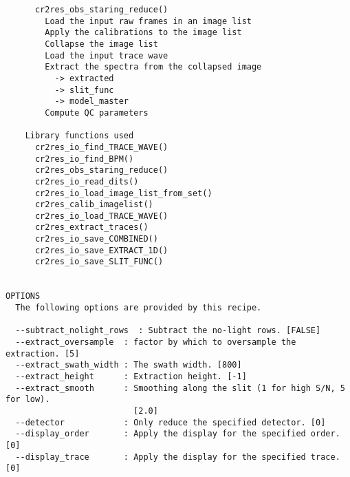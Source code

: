 \begin{verbatim}
      cr2res_obs_staring_reduce()                                         
        Load the input raw frames in an image list                        
        Apply the calibrations to the image list                          
        Collapse the image list                                           
        Load the input trace wave                                         
        Extract the spectra from the collapsed image                      
          -> extracted                                                    
          -> slit_func                                                    
          -> model_master                                                 
        Compute QC parameters                                             
                                                                          
    Library functions used                                                
      cr2res_io_find_TRACE_WAVE()                                         
      cr2res_io_find_BPM()                                                
      cr2res_obs_staring_reduce()                                         
      cr2res_io_read_dits()                                               
      cr2res_io_load_image_list_from_set()                                
      cr2res_calib_imagelist()                                            
      cr2res_io_load_TRACE_WAVE()                                         
      cr2res_extract_traces()                                             
      cr2res_io_save_COMBINED()                                           
      cr2res_io_save_EXTRACT_1D()                                         
      cr2res_io_save_SLIT_FUNC()                                          
  

OPTIONS
  The following options are provided by this recipe.

  --subtract_nolight_rows  : Subtract the no-light rows. [FALSE]
  --extract_oversample  : factor by which to oversample the extraction. [5]
  --extract_swath_width : The swath width. [800]
  --extract_height      : Extraction height. [-1]
  --extract_smooth      : Smoothing along the slit (1 for high S/N, 5 for low).
                          [2.0]
  --detector            : Only reduce the specified detector. [0]
  --display_order       : Apply the display for the specified order. [0]
  --display_trace       : Apply the display for the specified trace. [0]

\end{verbatim}

